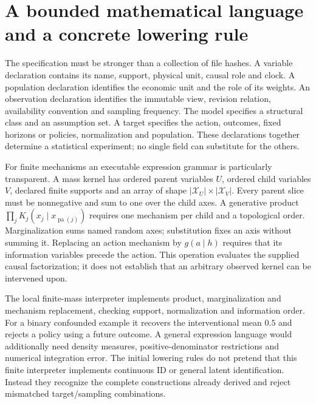 \section{A bounded mathematical language and a concrete lowering rule}
\label{s4:scientific-language}
The specification must be stronger than a collection of file hashes. A
variable declaration contains its name, support, physical unit, causal role
and clock. A population declaration identifies the economic unit and the
role of its weights. An observation declaration identifies the immutable
view, revision relation, availability convention and sampling frequency.
The model specifies a structural class and an assumption set. A target
specifies the action, outcomes, fixed horizons or policies, normalization
and population. These declarations together determine a statistical
experiment; no single field can substitute for the others.

For finite mechanisms an executable expression grammar is particularly
transparent. A mass kernel has ordered parent variables $U$, ordered child
variables $V$, declared finite supports and an array of shape
$|\mathcal X_U|\times|\mathcal X_V|$. Every parent slice must be
nonnegative and sum to one over the child axes. A generative product
$\prod_jK_j(x_j\mid x_{\operatorname{pa}(j)})$ requires one mechanism
per child and a topological order. Marginalization sums named random axes;
substitution fixes an axis without summing it. Replacing an action mechanism
by $g(a\mid h)$ requires that its information variables precede the action.
This operation evaluates the supplied causal factorization; it does not
establish that an arbitrary observed kernel can be intervened upon.

The local finite-mass interpreter implements product, marginalization and
mechanism replacement, checking support, normalization and information order.
For a binary confounded example it recovers the interventional mean $0.5$
and rejects a policy using a future outcome. A general expression language
would additionally need density measures, positive-denominator restrictions
and numerical integration error. The initial lowering rules do not pretend
that this finite interpreter implements continuous ID or general latent
identification. Instead they recognize the complete constructions already
derived and reject mismatched target/sampling combinations.

